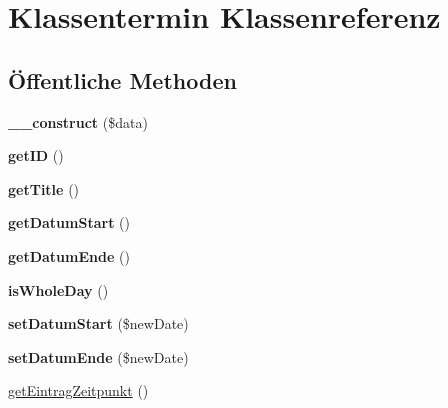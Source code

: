 \hypertarget{class_klassentermin}{}\section{Klassentermin Klassenreferenz}
\label{class_klassentermin}
\subsection*{Öffentliche Methoden}
\begin{DoxyCompactItemize}
\item 
\mbox{\label{class_klassentermin_ae90eabb037cb571a3155866f01e47d18}} 
{\bfseries \+\_\+\+\_\+construct} (\$data)
\item 
\mbox{\label{class_klassentermin_aef820ad41f3ce15acd00f6101132588a}} 
{\bfseries get\+ID} ()
\item 
\mbox{\label{class_klassentermin_a6c4e4f58414d9b96d5015e6253f5da91}} 
{\bfseries get\+Title} ()
\item 
\mbox{\label{class_klassentermin_a39d12fd2ee1716e8942878b720b3cf6e}} 
{\bfseries get\+Datum\+Start} ()
\item 
\mbox{\label{class_klassentermin_a9f965c7eea2553f6fdf831ceebbc0dd3}} 
{\bfseries get\+Datum\+Ende} ()
\item 
\mbox{\label{class_klassentermin_a1563eabdb73544165c5c568080ebed5a}} 
{\bfseries is\+Whole\+Day} ()
\item 
\mbox{\label{class_klassentermin_adc518460333042389a96eb968e6baa72}} 
{\bfseries set\+Datum\+Start} (\$new\+Date)
\item 
\mbox{\label{class_klassentermin_a60e2a2990172f6a2a82525e7c1d6000c}} 
{\bfseries set\+Datum\+Ende} (\$new\+Date)
\item 
\mbox{\hyperlink{class_klassentermin_af0851ccc77deaaca1b921ef619f44a52}{get\+Eintrag\+Zeitpunkt}} ()
\item 
\mbox{\label{class_klassentermin_a1cc6bb251a1ecbc6ef2db1aead8b9e0b}} 

\end{DoxyCompactItemize}
